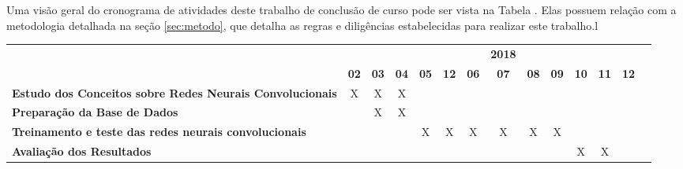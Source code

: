 
Uma visão geral do cronograma de atividades deste trabalho de conclusão de curso pode ser vista na Tabela . Elas possuem relação com a metodologia detalhada na seção \ref{sec:metodo}, que detalha as regras e diligências estabelecidas para realizar este trabalho.l
\newline

\begin{table}[ht]
\label{tab:cronograma}
\begin{center}
\begin{small}
\begin{tabular}{p{5cm}ccccccccccccc}
  \toprule
                & &  &  & &  &  & \textbf{2018} &  &  &  &  & & \\
                & \textbf{02} & \textbf{03} & \textbf{04} & \textbf{05} & \textbf{12} & \textbf{06} & \textbf{07} & \textbf{08} & \textbf{09} & \textbf{10} & \textbf{11} & \textbf{12}\\
  \midrule
  \textbf{Estudo dos Conceitos sobre
  Redes Neurais Convolucionais}     &      X      &   X        &         X   &            &            &            &            &            &             &             &               &      \\
  \textbf{Preparação da Base de Dados}                                     &            &      X     &      X     &            &            &            &            &            &             &             &               &      \\
  \textbf{Treinamento e teste das
  redes neurais convolucionais}          &            &            &            &      X     &     X       & X           &      X      &    X        &   X          &             &               &      \\
  \textbf{Avaliação dos Resultados}                               &            &            &            &            &            &          &            &            &             &      X       &      X         &      \\
  \bottomrule
\end{tabular}
\end{small}
\end{center}
\end{table}
